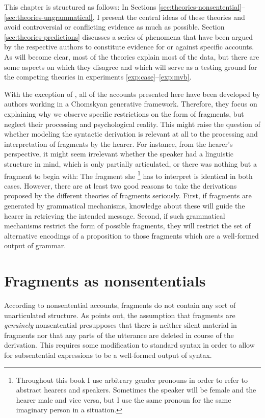 \noindent This chapter is structured as follows: In Sections \ref{sec:theories-nonsentential}--\ref{sec:theories-ungrammatical}, I present the central ideas of these theories and avoid controversial or conflicting evidence as much as possible. Section \ref{sec:theories-predictions} discusses a series of phenomena that have been argued by the respective authors to constitute evidence for or against specific accounts. As will become clear, most of the theories explain most of the data, but there are some aspects on which they disagree and which will serve as a testing ground for the competing theories in experiments \ref{exp:case}--\ref{exp:mvb}.

With the exception of \citet{bergen.goodman2015}, all of the accounts presented here have been developed by authors working in a Chomskyan generative framework. Therefore, they focus on explaining why we observe specific restrictions on the form of fragments, but neglect their processing and psychological reality. This might raise the question of whether modeling the syntactic derivation is relevant at all to the processing and interpretation of fragments by the hearer. For instance, from the hearer's perspective, it might seem irrelevant whether the speaker had a linguistic structure in mind, which is only partially articulated, or there was nothing but a fragment to begin with: The fragment she%
%
\footnote{Throughout this book I use arbitrary gender pronouns in order to refer to abstract hearers and speakers. Sometimes the speaker will be female and the hearer male and vice versa, but I use the same pronoun for the same imaginary person in a situation.}\afterfn%
% 
has to interpret is identical in both cases. However, there are at least two good reasons to take the derivations proposed by the different theories of fragments seriously. First, if fragments are generated by grammatical mechanisms, knowledge about these will guide the hearer in retrieving the intended message. Second, if such grammatical mechanisms restrict the form of possible fragments, they will restrict the set of alternative encodings of a proposition to those fragments which are a well-formed output of grammar.

\section{Fragments as nonsententials}
\label{sec:theories-nonsentential}
According to nonsentential accounts, fragments do not contain any sort of unarti\-culated structure. As \citet{stainton2006} points out, the assumption that fragments are \textit{genuinely} nonsentential presupposes that there is neither silent material in fragments nor that any parts of the utterance are deleted in course of the derivation. This requires some modification to standard syntax in order to allow for subsentential expressions to be a well-formed output of syntax.

